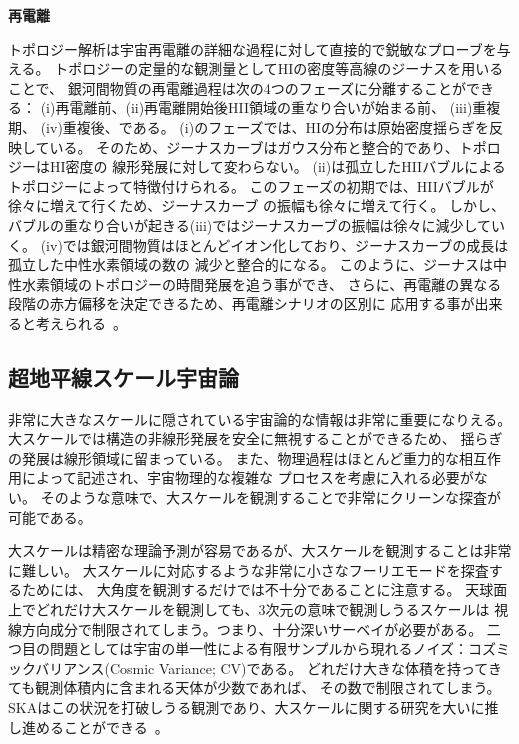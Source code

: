 \begin{description}
\item {\bf 再電離　}

トポロジー解析は宇宙再電離の詳細な過程に対して直接的で鋭敏なプローブを与える。
トポロジーの定量的な観測量としてHIの密度等高線のジーナスを用いることで、
銀河間物質の再電離過程は次の4つのフェーズに分離することができる：
(i)再電離前、(ii)再電離開始後HII領域の重なり合いが始まる前、 (iii)重複期、 (iv)重複後、である。
(i)のフェーズでは、HIの分布は原始密度揺らぎを反映している。
そのため、ジーナスカーブはガウス分布と整合的であり、トポロジーはHI密度の
線形発展に対して変わらない。
(ii)は孤立したHIIバブルによるトポロジーによって特徴付けられる。
このフェーズの初期では、HIIバブルが徐々に増えて行くため、ジーナスカーブ
の振幅も徐々に増えて行く。
しかし、バブルの重なり合いが起きる(iii)ではジーナスカーブの振幅は徐々に減少していく。
(iv)では銀河間物質はほとんどイオン化しており、ジーナスカーブの成長は孤立した中性水素領域の数の
減少と整合的になる。
このように、ジーナスは中性水素領域のトポロジーの時間発展を追う事ができ、
さらに、再電離の異なる段階の赤方偏移を決定できるため、再電離シナリオの区別に
応用する事が出来ると考えられる~\citep{2014JKAS...47...49H}。
\end{description}


\subsection{超地平線スケール宇宙論}\label{cosmology.s2.ss5}

非常に大きなスケールに隠されている宇宙論的な情報は非常に重要になりえる。
大スケールでは構造の非線形発展を安全に無視することができるため、
揺らぎの発展は線形領域に留まっている。
また、物理過程はほとんど重力的な相互作用によって記述され、宇宙物理的な複雑な
プロセスを考慮に入れる必要がない。
そのような意味で、大スケールを観測することで非常にクリーンな探査が可能である。

大スケールは精密な理論予測が容易であるが、大スケールを観測することは非常に難しい。
大スケールに対応するような非常に小さなフーリエモードを探査するためには、
大角度を観測するだけでは不十分であることに注意する。
天球面上でどれだけ大スケールを観測しても、$3$次元の意味で観測しうるスケールは
視線方向成分で制限されてしまう。つまり、十分深いサーベイが必要がある。
二つ目の問題としては宇宙の単一性による有限サンプルから現れるノイズ：コズミックバリアンス(Cosmic Variance; CV)である。
どれだけ大きな体積を持ってきても観測体積内に含まれる天体が少数であれば、
その数で制限されてしまう。
SKAはこの状況を打破しうる観測であり、大スケールに関する研究を大いに推し進めることができる~\citep{Camera:2015yqa}。


